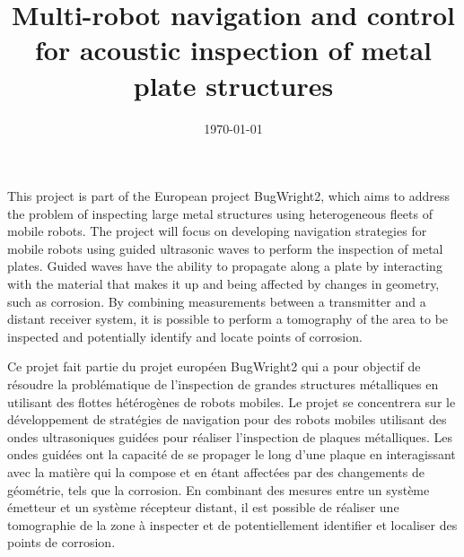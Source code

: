 \documentclass[init,francais,RandD]{rapportPFE}  %
\title{Multi-robot navigation and control for acoustic inspection of metal plate structures}
\date{\today}
\begin{document}
	\maketitle
	\begin{ResumeMotsCles}
		\begin{resumeEn}
			This project is part of the European project BugWright2, which aims to address the problem of inspecting large metal structures using heterogeneous fleets of mobile robots. The project will focus on developing navigation strategies for mobile robots using guided ultrasonic waves to perform the inspection of metal plates. Guided waves have the ability to propagate along a plate by interacting with the material that makes it up and being affected by changes in geometry, such as corrosion. By combining measurements between a transmitter and a distant receiver system, it is possible to perform a tomography of the area to be inspected and potentially identify and locate points of corrosion.
		\end{resumeEn}
		\begin{resumeFr}
			Ce projet fait partie du projet européen BugWright2 qui a pour objectif de résoudre la problématique de l'inspection de grandes structures métalliques en utilisant des flottes hétérogènes de robots mobiles. Le projet se concentrera sur le développement de stratégies de navigation pour des robots mobiles utilisant des ondes ultrasoniques guidées pour réaliser l'inspection de plaques métalliques. Les ondes guidées ont la capacité de se propager le long d'une plaque en interagissant avec la matière qui la compose et en étant affectées par des changements de géométrie, tels que la corrosion. En combinant des mesures entre un système émetteur et un système récepteur distant, il est possible de réaliser une tomographie de la zone à inspecter et de potentiellement identifier et localiser des points de corrosion.
		\end{resumeFr}
	\end{ResumeMotsCles}
	\setcounter{tocdepth}{3}
	\tableofcontents
	\cleardoublepage
\end{document}

